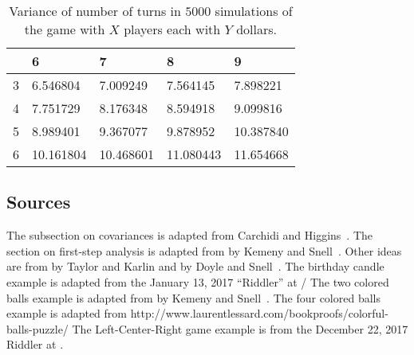 \documentclass[12pt]{article}
\begin{document}
\begin{example}
  \begin{table}
    \centering
    \begin{tabular}{l | llll}
      &  6       & 7       & 8       & 9      \\
     \hline
     3&   6.546804 &  7.009249 &  7.564145 &  7.898221 \\
     4& 7.751729 &  8.176348 &  8.594918 &  9.099816 \\
     5&  8.989401 &  9.367077 &  9.878952 & 10.387840 \\
     6&  10.161804 & 10.468601 & 11.080443 & 11.654668
\end{tabular}
    \caption{Variance of number of turns in $5000$ simulations of the game
      with $X$ players each with $Y$ dollars.}
    \label{tab:waitingtimeabsorbtion:lcrmean}
  \end{table}





\end{example}

\subsection*{Sources} The subsection on covariances
is adapted from Carchidi and
Higgins~\cite{carchidi17}.  The section on first-step analysis is
adapted from  by Kemeny and Snell~\cite{kemeny60}.
Other ideas are from  by Taylor and Karlin and  by Doyle and Snell~\cite{doyle84}.  The birthday candle
example is adapted from the January 13, 2017 ``Riddler'' at
/
The two colored balls
example is adapted from  by Kemeny and
Snell~\cite{kemeny60}. The four colored balls example is adapted from
http://www.laurentlessard.com/bookproofs/colorful-balls-puzzle/
The Left-Center-Right game example is from the December 22, 2017
  Riddler at
.
\end{document}
